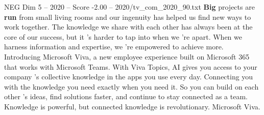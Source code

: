 \begin{textsample}{NEG Dim 5 – 2020 – Score -2.00 – 2020/tv\_com\_2020\_90.txt}  \label{ex:f5_neg_065}
\textbf{Big} projects are \textbf{run} from small living rooms and our ingenuity has helped us find new ways to work together.
The knowledge we share with each other has always been at the core of our success, but it 's harder to tap into when we 're apart.
When we harness information and expertise, we 're empowered to achieve more.
Introducing Microsoft Viva, a new employee experience built on Microsoft 365 that works with Microsoft Teams.
With Viva Topics, AI gives you access to your company 's collective knowledge in the apps you use every day.
Connecting you with the knowledge you need exactly when you need it.
So you can build on each other 's ideas, find solutions faster, and continue to stay connected as a team.
Knowledge is powerful, but connected knowledge is revolutionary.
Microsoft Viva.

\end{textsample}
